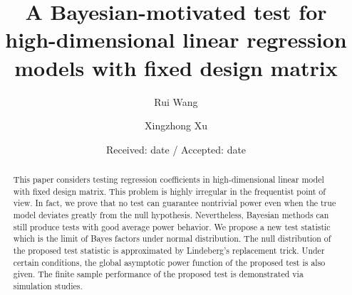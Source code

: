 \documentclass[smallextended]{svjour3}       %
\begin{document}
\title{
A Bayesian-motivated test for high-dimensional linear regression models with fixed design matrix
}


\author{ Rui Wang         \and
        Xingzhong Xu %
}



\date{Received: date / Accepted: date}


\maketitle

\begin{abstract}

This paper considers testing regression coefficients in high-dimensional linear model with fixed design matrix.
This problem is highly irregular in the frequentist point of view.
In fact, we prove that no test can guarantee nontrivial power even when the true model deviates greatly from the null hypothesis.
    Nevertheless, Bayesian methods can still produce tests with good average power behavior.
    We propose a new test statistic which is the limit of Bayes factors under normal distribution.
    The null distribution of the proposed test statistic is approximated by Lindeberg's replacement trick.
    Under certain conditions, the global asymptotic power function of the proposed test is also given.
    The finite sample performance of the proposed test is demonstrated via simulation studies.
\end{abstract}
\end{document}
